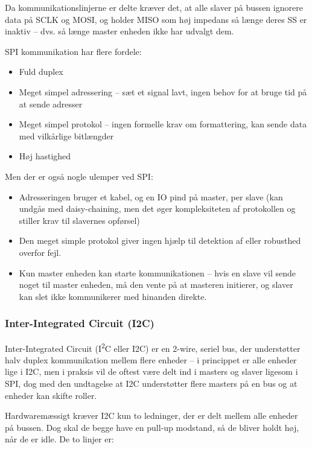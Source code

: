 Da kommunikationslinjerne er delte kræver det, at alle slaver på bussen ignorere data på SCLK og MOSI, og holder MISO som høj impedans så længe deres SS er inaktiv – dvs. så længe master enheden ikke har udvalgt dem.

SPI kommunikation har flere fordele:

\begin{itemize}
    \item Fuld duplex
    \item Meget simpel adressering – sæt et signal lavt, ingen behov for at bruge tid på at sende adresser
    \item Meget simpel protokol – ingen formelle krav om formattering, kan sende data med vilkårlige bitlængder
    \item Høj hastighed
\end{itemize}

Men der er også nogle ulemper ved SPI:

\begin{itemize}
    \item Adresseringen bruger et kabel, og en IO pind på master, per slave (kan undgås med daisy-chaining, men det øger kompleksiteten af protokollen og stiller krav til slavernes opførsel)
    \item Den meget simple protokol giver ingen hjælp til detektion af eller robusthed overfor fejl.
    \item Kun master enheden kan starte kommunikationen – hvis en slave vil sende noget til master enheden, må den vente på at masteren initierer, og slaver kan slet ikke kommunikerer med hinanden direkte.
\end{itemize}

\subsubsection{Inter-Integrated Circuit (I2C)}

Inter-Integrated Circuit (I\textsuperscript{2}C eller I2C) er en 2-wire, seriel bus, der understøtter halv duplex kommunikation mellem flere enheder – i princippet er alle enheder lige i I2C, men i praksis vil de oftest være delt ind i masters og slaver ligesom i SPI, dog med den undtagelse at I2C understøtter flere masters på en bus og at enheder kan skifte roller.

Hardwaremæssigt kræver I2C kun to ledninger, der er delt mellem alle enheder på bussen. Dog skal de begge have en pull-up modstand, så de bliver holdt høj, når de er idle. De to linjer er:


